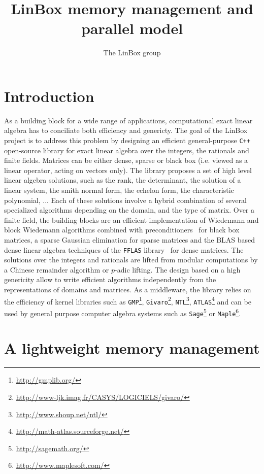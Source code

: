\documentclass[runningheads,a4paper]{llncs}
\newcommand{\linboxsp}{{\sc LinBox}\xspace}
\begin{document}
\mainmatter  
\title{\linboxsp memory management and parallel model}
\author{The \linboxsp group}
\maketitle

\section{Introduction}

As a building block for a wide range of applications, computational exact linear
algebra has to conciliate both efficiency and genericty. The goal of the 
\linboxsp project is to address this problem by designing an efficient general-purpose
\texttt{C++} open-source library for exact linear algebra over the integers, the
rationals and finite fields. 
Matrices can be either dense, sparse or black box (i.e. viewed as a linear
operator, acting on vectors only). The library proposes a set of high level
linear algebra solutions, such as the rank, the determinant, the solution of a
linear system, the smith normal form, the echelon form, the characteristic
polynomial, ... Each of these solutions involve a hybrid combination of several specialized
algorithms depending on the domain, and the type of matrix. Over a finite field,
the building blocks are an efficient implementation of Wiedemann and block
Wiedemann algorithms combined with preconditioners~\cite{CEKSTV:2002:EP} for
black box matrices, a sparse Gaussian elimination for sparse matrices and the
BLAS based dense linear algebra techniques of the \texttt{FFLAS}
library~\cite{DGP:2008:dlaff} for dense matrices. The solutions over the integers
and rationals are lifted from modular computations by a Chinese remainder
algorithm or $p$-adic lifting.
The design based on a high genericity allow to write efficient algorithms  independently from the
representations of domains and matrices. As a middleware, the library relies on the
efficiency of kernel libraries such as  \texttt{GMP}\footnote{\url{http://gmplib.org/}},
\texttt{Givaro}\footnote{\url{http://www-ljk.imag.fr/CASYS/LOGICIELS/givaro/}},
\texttt{NTL}\footnote{\url{http://www.shoup.net/ntl/}},
\texttt{ATLAS}\footnote{\url{http://math-atlas.sourceforge.net/}} and can be used by general
purpose computer algebra systems such as \texttt{Sage}\footnote{\url{http://sagemath.org/}} or \texttt{Maple}\footnote{\url{http://www.maplesoft.com/}}. 

\section{A lightweight memory management}
\end{document}
